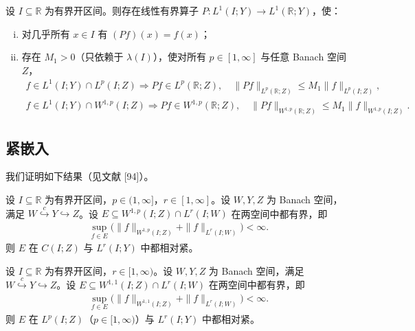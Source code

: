 \documentclass[../../main.tex]{subfiles}%
\begin{document}
\begin{proposition}\label{proposition:ch04-延拓}
设 $I\subseteq\mathbb{R}$ 为有界开区间。则存在线性有界算子 $P:L^1(I;Y)\to L^1(\mathbb{R};Y)$，使：
\begin{enumerate}[(i)]
\item\label{item:ch04-延拓-i} 对几乎所有 $x\in I$ 有 $(Pf)(x)=f(x)$；
\item\label{item:ch04-延拓-ii} 存在 $M_1>0$（只依赖于 $\lambda(I)$），使对所有 $p\in[1,\infty]$ 与任意 Banach 空间 $Z$，
\begin{align}
f\in L^1(I;Y)\cap L^p(I;Z)\Rightarrow Pf\in L^p(\mathbb{R};Z),\quad \|Pf\|_{L^p(\mathbb{R};Z)}\leqslant M_1\|f\|_{L^p(I;Z)}, \label{align:ch04-4.137a}
\end{align}
\begin{align}
f\in L^1(I;Y)\cap W^{1,p}(I;Z)\Rightarrow Pf\in W^{1,p}(\mathbb{R};Z),\quad \|Pf\|_{W^{1,p}(\mathbb{R};Z)}\leqslant M_1\|f\|_{W^{1,p}(I;Z)}. \label{align:ch04-4.137b}
\end{align}
\end{enumerate}
\end{proposition}

\subsection{紧嵌入}\label{subsection:ch04-紧嵌入}

我们证明如下结果（见文献 [94]）。

\begin{theorem}[Aubin]\label{theorem:ch04-Aubin}
设 $I\subseteq\mathbb{R}$ 为有界开区间，$p\in(1,\infty]$，$r\in[1,\infty]$。设 $W,Y,Z$ 为 Banach 空间，满足 $W\overset{c}{\hookrightarrow}Y\hookrightarrow Z$。设 $E\subseteq W^{1,p}(I;Z)\cap L^r(I;W)$ 在两空间中都有界，即
\begin{align}
\sup_{f\in E}\big(\|f\|_{W^{1,p}(I;Z)}+\|f\|_{L^r(I;W)}\big)<\infty. \label{align:ch04-4.138}
\end{align}
则 $E$ 在 $C(I;Z)$ 与 $L^r(I;Y)$ 中都相对紧。
\end{theorem}

\begin{theorem}[Simon]\label{theorem:ch04-Simon}
设 $I\subseteq\mathbb{R}$ 为有界开区间，$r\in[1,\infty)$。设 $W,Y,Z$ 为 Banach 空间，满足 $W\overset{c}{\hookrightarrow}Y\hookrightarrow Z$。设 $E\subseteq W^{1,1}(I;Z)\cap L^r(I;W)$ 在两空间中都有界，即
\begin{align}
\sup_{f\in E}\big(\|f\|_{W^{1,1}(I;Z)}+\|f\|_{L^r(I;W)}\big)<\infty. \label{align:ch04-4.139}
\end{align}
则 $E$ 在 $L^p(I;Z)$（$p\in[1,\infty)$）与 $L^r(I;Y)$ 中都相对紧。
\end{theorem}
\end{document}
